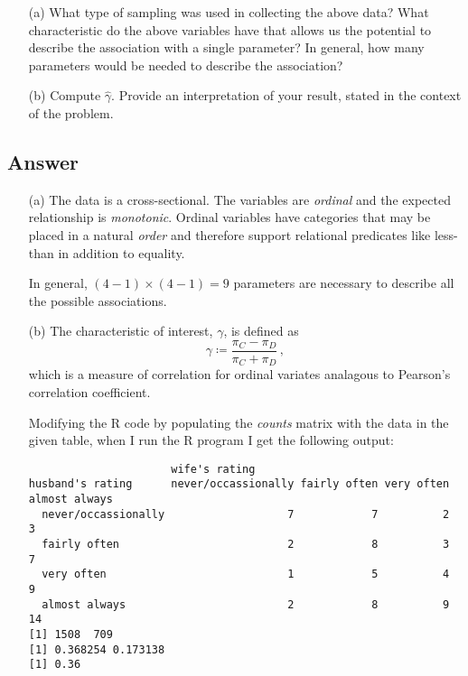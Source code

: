 \documentclass[10pt]{fphw}
\begin{document}
\begin{enumerate}
    \item[(a)] What type of sampling was used in collecting the above data? What characteristic do the above variables
    have that allows us the potential to describe the association with a single parameter? In general, how many
    parameters would be needed to describe the association?
    \item[(b)] Compute $\hat\gamma$. Provide an interpretation of your result, stated in the context of the problem.
\end{enumerate}

\subsection*{Answer}


\begin{enumerate}
    \item[(a)] The data is a cross-sectional. The variables are \emph{ordinal} and the expected relationship
    is \emph{monotonic}. Ordinal variables have categories that may be placed in a natural \emph{order} and
    therefore support relational predicates like less-than in addition
    to equality.
    
    In general, $(4-1) \times (4-1) = 9$ parameters are necessary to describe all the possible
    associations.
    
    \item[(b)] The characteristic of interest, $\gamma$, is defined as
    \begin{equation*}
        \gamma \coloneqq \frac{\pi_C - \pi_D}{\pi_C + \pi_D}\,,
    \end{equation*}
    which is a measure of correlation for ordinal variates analagous to 
    Pearson's correlation coefficient.
    
    Modifying the R code by populating the \emph{counts} matrix with the data in the given 
    table, when I run the R program I get the following output:
    
\begin{verbatim}
                      wife's rating
husband's rating      never/occassionally fairly often very often almost always
  never/occassionally                   7            7          2             3
  fairly often                          2            8          3             7
  very often                            1            5          4             9
  almost always                         2            8          9            14
[1] 1508  709
[1] 0.368254 0.173138
[1] 0.36
\end{verbatim}
\end{enumerate}
\end{document}
